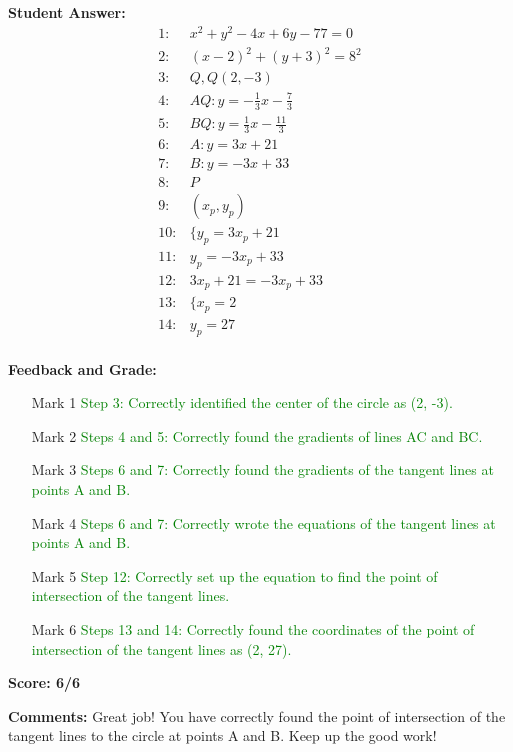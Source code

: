 \documentclass{article}
\begin{document}
\textbf{Student Answer:}
\begin{align*}
1: & x^2+y^2-4x+6y-77=0 \\
2: & (x-2)^2+(y+3)^2=8^2 \\
3: & Q,Q(2,-3) \\
4: & AQ:y=-\frac{1}{3}x-\frac{7}{3} \\
5: & BQ:y=\frac{1}{3}x-\frac{11}{3} \\
6: & A:y=3x+21 \\
7: & B:y=-3x+33 \\
8: & P \\
9: & (x_p,y_p) \\
10: & \{y_p=3x_p+21 \\
11: & y_p=-3x_p+33 \\
12: & 3x_p+21=-3x_p+33 \\
13: & \{x_p=2 \\
14: & y_p=27 \\
\end{align*}

\textbf{Feedback and Grade:}
\begin{itemize}
\item[Mark 1] \textcolor{green}{Step 3: Correctly identified the center of the circle as (2, -3).}
\item[Mark 2] \textcolor{green}{Steps 4 and 5: Correctly found the gradients of lines AC and BC.}
\item[Mark 3] \textcolor{green}{Steps 6 and 7: Correctly found the gradients of the tangent lines at points A and B.}
\item[Mark 4] \textcolor{green}{Steps 6 and 7: Correctly wrote the equations of the tangent lines at points A and B.}
\item[Mark 5] \textcolor{green}{Step 12: Correctly set up the equation to find the point of intersection of the tangent lines.}
\item[Mark 6] \textcolor{green}{Steps 13 and 14: Correctly found the coordinates of the point of intersection of the tangent lines as (2, 27).}
\end{itemize}

\textbf{Score: 6/6}

\textbf{Comments:} Great job! You have correctly found the point of intersection of the tangent lines to the circle at points A and B. Keep up the good work!
\end{document}
